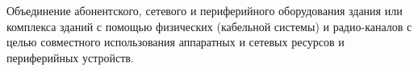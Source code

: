 Объединение абонентского, сетевого и периферийного
оборудования здания или комплекса зданий с помощью
физических (кабельной системы) и радио-каналов с целью
совместного использования аппаратных и сетевых ресурсов и
периферийных устройств.